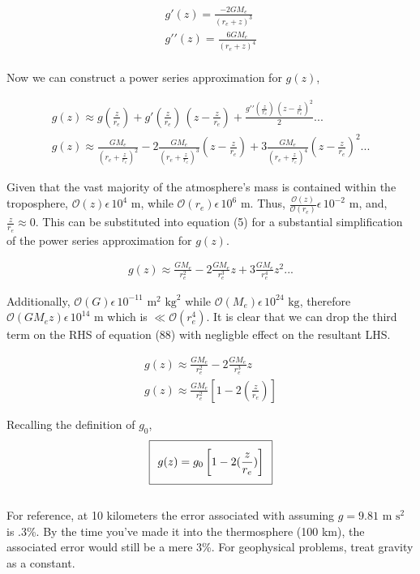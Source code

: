 \documentclass[a4paper,12pt]{article}
\newcommand{\bigO}{\mathcal{O}}
\begin{document}
\begin{align}
g\prime(z) = \frac{-2GM_{e}}{(r_{e} + z)^{3}}\\
g\prime\prime(z) = \frac{6GM_{e}}{(r_{e} + z)^{4}}\\
\end{align}

Now we can construct a power series approximation for $g(z)$,

\begin{align}
g(z) \approx g(\frac{z}{r_e}) + g\prime(\frac{z}{r_{e}})\,(z-\frac{z}{r_{e}}) + \frac{g\prime\prime(\frac{z}{r_{e}})\,(z-\frac{z}{r_{e}})^{2}}{2}...\\
g(z) \approx \frac{GM_{e}}{(r_e + \frac{z}{r_e})^{2}} - 2\frac{GM_{e}}{(r_e+\frac{z}{r_{e}})^{3}}(z-\frac{z}{r_{e}}) + 3\frac{GM_{e}}{(r_e+\frac{z}{r_{e}})^{4}}(z-\frac{z}{r_{e}})^{2}...
\end{align}

Given that the vast majority of the atmosphere's mass is contained within the troposphere, $\bigO{(z)} \epsilon \, 10^{4} \text{ m}$, while $\bigO{(r_{e})} \epsilon \, 10^6 \text{ m}$. Thus, $\frac{\bigO{(z)}}{\bigO{(r_{e})}} \epsilon \, 10^{-2} \text { m}$, and, $\frac{z}{r_{e}} \approx 0$. This can be substituted into equation (5) for a substantial simplification of the power series approximation for $g(z)$.

\begin{align}
g(z) \approx \frac{GM_{e}}{r_{e}^{2}} - 2\frac{GM_{e}}{r_e^{3}}z + 3\frac{GM_{e}}{r_{e}^{4}}z^{2}...
\end{align}

Additionally, $\bigO{(G)} \epsilon \, 10^{-11} \text{ m}^{2} \text{ kg}^{2}$ while $\bigO{(M_{e})} \epsilon \, 10^{24} \text{ kg}$, therefore $\bigO{(GM_{e}z)} \epsilon \, 10^{14} \text{ m}$ which is $\ll \bigO{(r_{e}^{4})}$. It is clear that we can drop the third term on the RHS of equation (88) with negligble effect on the resultant LHS.

\begin{align}
g(z) \approx \frac{GM_{e}}{r_{e}^{2}} - 2\frac{GM_{e}}{r_e^{3}}z\\
g(z) \approx \frac{GM_{e}}{r_{e}^{2}}\left[1 - 2(\frac{z}{r_{e}})\right]
\end{align}

Recalling the definition of $g_{0}$,\\

\begin{equation}
\setlength\fboxsep{0.25cm}
\setlength\fboxrule{0.4pt}
\boxed{g(z) = g_{0}\left[1 - 2(\frac{z}{r_{e}})\right]}
\end{equation}\\

For reference, at 10 kilometers the error associated with assuming $g = 9.81 \text{ m s}^2$ is .3\%. By the time you've made it into the thermosphere (100 km), the associated error would still be a mere 3\%. For geophysical problems, treat gravity as a constant. 
\end{document}
